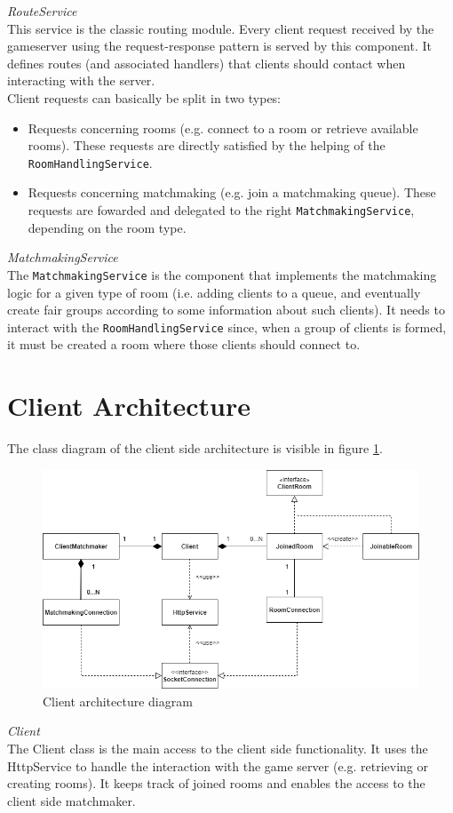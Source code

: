 \bigskip
\textit{RouteService}
\\
This service is the classic routing module.
Every client request received by the gameserver using the request-response pattern is served by this component.
It defines routes (and associated handlers) that clients should contact when interacting with the server.
\\
Client requests can basically be split in two types:
\begin{itemize}
	\item Requests concerning rooms (e.g. connect to a room or retrieve available rooms). These requests are directly satisfied by the helping of the \texttt{RoomHandlingService}.
	\item Requests concerning matchmaking (e.g. join a matchmaking queue). These requests are fowarded and delegated to the right \texttt{MatchmakingService}, depending on the room type.
\end{itemize}

\bigskip
\textit{MatchmakingService}
\\
The \texttt{MatchmakingService} is the component that implements the matchmaking logic for a given type of room (i.e. adding clients to a queue, and eventually create fair groups according to some information about such clients). It needs to interact with the \texttt{RoomHandlingService} since, when a group of clients is formed, it must be created a room where those clients should connect to.


\section{Client Architecture}

The class diagram of the client side architecture is visible in figure \ref{fig:client_architecture}. 
\begin{figure}[H]
	\centering
	\includegraphics[scale=0.65]{images/3-architecture/client-architecture.png}
	\caption{Client architecture diagram}
	\label{fig:client_architecture}
\end{figure}
\bigskip
\textit{Client}
\\
The Client class is the main access to the client side functionality.
It uses the HttpService to handle the interaction with the game server (e.g. retrieving or creating rooms).
It keeps track of joined rooms and enables the access to the client side matchmaker.

